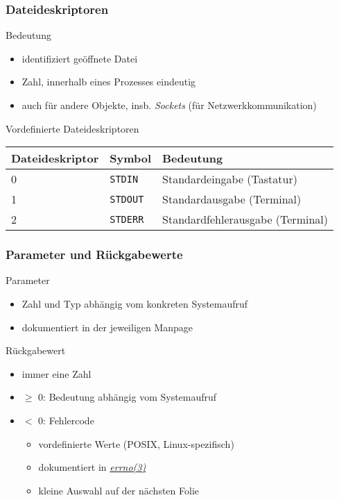 \begin{frame}
  \frametitle{Dateideskriptoren}

  \begin{block}{Bedeutung}
    \begin{itemize}
      \item identifiziert geöffnete Datei
      \item Zahl, innerhalb eines Prozesses eindeutig
      \item auch für andere Objekte, insb. \emph{Sockets} (für Netzwerkkommunikation)
    \end{itemize}
  \end{block}

  \begin{block}{Vordefinierte Dateideskriptoren}
    \centering
    \medskip
    \begin{tabular}{|lll|}
      \hline
      \textbf{Dateideskriptor} & \textbf{Symbol} & \textbf{Bedeutung} \\
      \hline
        0      & \texttt{STDIN}    & Standardeingabe (Tastatur) \\
        1      & \texttt{STDOUT}   & Standardausgabe (Terminal) \\
        2      & \texttt{STDERR}   & Standardfehlerausgabe (Terminal) \\
      \hline
    \end{tabular}
    \medskip
  \end{block}
\end{frame}

\begin{frame}
  \frametitle{Parameter und Rückgabewerte}

  \begin{block}{Parameter}
    \begin{itemize}
      \item Zahl und Typ abhängig vom konkreten Systemaufruf
      \item dokumentiert in der jeweiligen Manpage
    \end{itemize}
  \end{block}

  \begin{block}{Rückgabewert}
    \begin{itemize}
      \item immer eine Zahl
      \item $\ge$ 0: Bedeutung abhängig vom Systemaufruf
      \item $<$   0: Fehlercode
      \begin{itemize}
        \item vordefinierte Werte (POSIX, Linux-spezifisch)
        \item dokumentiert in \href{http://man7.org/linux/man-pages/man3/errno.3.html}{\emph{errno(3)}} 
        \item kleine Auswahl auf der nächsten Folie
      \end{itemize}
    \end{itemize}
  \end{block}


\end{frame}


